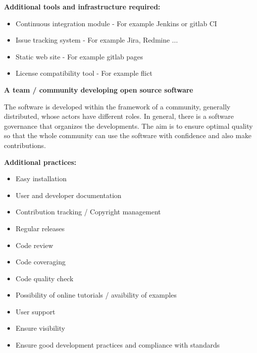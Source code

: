 {\bf Additional tools and infrastructure required:}
\begin{itemize}
\item Continuous integration module - For example Jenkins or gitlab CI
\item Issue tracking system - For example Jira, Redmine ...
\item Static web site - For example gitlab pages 
\item License compatibility tool - For example flict
\end{itemize}


\textbf{A team / community developing open source software}

The software is developed within the framework of a community,
generally distributed, whose actors have different roles. In general,
there is a software governance that organizes the developments. The
aim is to ensure optimal quality so that the whole community can use
the software with confidence and also make contributions.

{\bf Additional practices:}
\begin{itemize}
\item Easy installation
\item User and developer documentation
\item Contribution tracking / Copyright management
\item Regular releases
\item Code review
\item Code coveraging
\item Code quality check
\item Possibility of online tutorials / avaibility of examples
\item User support
\item Ensure visibility
\item Ensure good development practices and compliance with standards
\end{itemize}

